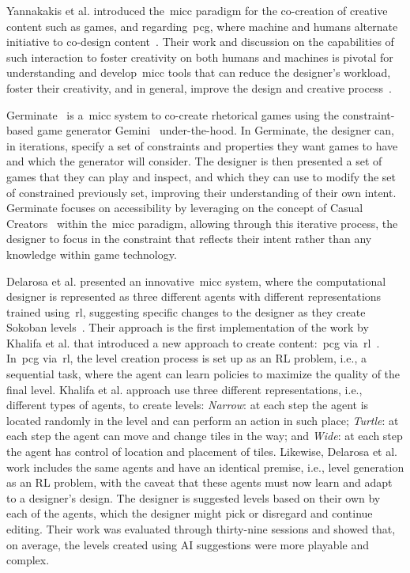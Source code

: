 Yannakakis et al. introduced the~\acrlong{micc} paradigm for the co-creation of creative content such as games, and regarding~\acrshort{pcg}, where machine and humans alternate initiative to co-design content~\cite{yannakakis_mixed-initiative_2014}. Their work and discussion on the capabilities of such interaction to foster creativity on both humans and machines is pivotal for understanding and develop~\acrshort{micc} tools that can reduce the designer's workload, foster their creativity, and in general, improve the design and creative process~\cite{liapis_can_2016,alvarez_fostering_2018}. 

Germinate~\cite{kreminski_germinate_2020} is a~\acrshort{micc} system to co-create rhetorical games using the constraint-based game generator Gemini~\cite{summerville_gemini_2018} under-the-hood. In Germinate, the designer can, in iterations, specify a set of constraints and properties they want games to have and which the generator will consider. The designer is then presented a set of games that they can play and inspect, and which they can use to modify the set of constrained previously set, improving their understanding of their own intent. Germinate focuses on accessibility by leveraging on the concept of Casual Creators~\cite{compton_casual_2015} within the~\acrshort{micc} paradigm, allowing through this iterative process, the designer to focus in the constraint that reflects their intent rather than any knowledge within game technology. 

Delarosa et al. presented an innovative~\acrshort{micc} system, where the computational designer is represented as three different agents with different representations trained using~\acrfull{rl}, suggesting specific changes to the designer as they create Sokoban levels~\cite{delarosa_mixed-initiative_2020}. Their approach is the first implementation of the work by Khalifa et al. that introduced a new approach to create content:~\acrshort{pcg} via~\acrshort{rl}~\cite{khalifa_pcgrl_2020}. In~\acrshort{pcg} via~\acrshort{rl}, the level creation process is set up as an RL problem, i.e., a sequential task, where the agent can learn policies to maximize the quality of the final level. Khalifa et al. approach use three different representations, i.e., different types of agents, to create levels: \textit{Narrow}: at each step the agent is located randomly in the level and can perform an action in such place; \textit{Turtle}: at each step the agent can move and change tiles in the way; and \textit{Wide}: at each step the agent has control of location and placement of tiles. Likewise, Delarosa et al. work includes the same agents and have an identical premise, i.e., level generation as an RL problem, with the caveat that these agents must now learn and adapt to a designer's design. The designer is suggested levels based on their own by each of the agents, which the designer might pick or disregard and continue editing. Their work was evaluated through thirty-nine sessions and showed that, on average, the levels created using AI suggestions were more playable and complex.

